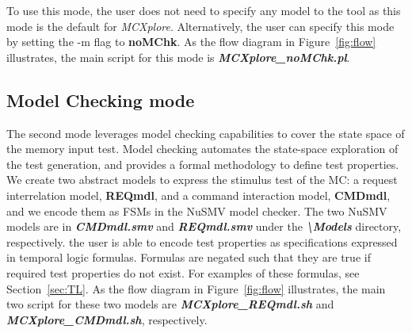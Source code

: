 To use this mode, the user does not need to specify any model to the tool as this mode is the default for \textit{MCXplore}. 
Alternatively, the user can specify this mode by setting the -m flag to \textbf{noMChk}. 
As the flow diagram in Figure~\ref{fig:flow} illustrates, the main script for this mode is \textit{\textbf{MCXplore\_noMChk.pl}}.



\subsection{Model Checking mode}
The second mode leverages model checking capabilities to cover the state space of the memory input test. 
Model checking automates the state-space exploration of the test generation,
and provides a formal methodology to define test properties.
We create two abstract models to express the stimulus test of the MC: a request interrelation model, \textbf{REQmdl}, and a command interaction model, \textbf{CMDmdl}, and we encode them as FSMs in the NuSMV model checker. The two NuSMV models are in \textbf{\textit{CMDmdl.smv}} and \textbf{\textit{REQmdl.smv}} under the \textbf{\textit{\textbackslash Models}} directory, respectively. 
the user is able to encode test properties as specifications expressed in temporal logic formulas. 
Formulas are negated such that they are true if required test properties do not exist. 
For examples of these formulas, see Section~\ref{sec:TL}.
As the flow diagram in Figure~\ref{fig:flow} illustrates, the main two script for these  two models are \textit{\textbf{MCXplore\_REQmdl.sh}} and \textit{\textbf{MCXplore\_CMDmdl.sh}}, respectively.
